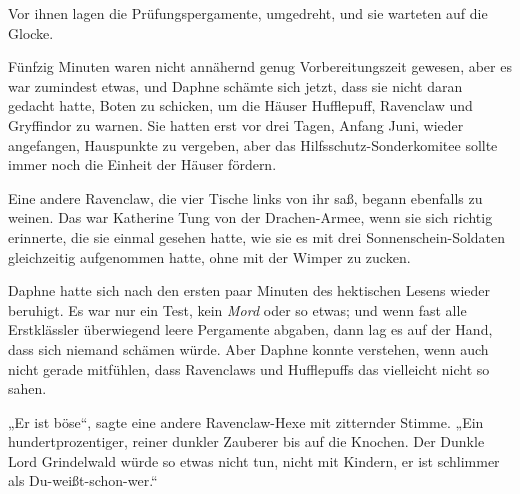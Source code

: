Vor ihnen lagen die Prüfungspergamente, umgedreht, und sie warteten auf die Glocke.

Fünfzig Minuten waren nicht annähernd genug Vorbereitungszeit gewesen, aber es war zumindest etwas, und Daphne schämte sich jetzt, dass sie nicht daran gedacht hatte, Boten zu schicken, um die Häuser Hufflepuff, Ravenclaw und Gryffindor zu warnen. Sie hatten erst vor drei Tagen, Anfang Juni, wieder angefangen, Hauspunkte zu vergeben, aber das Hilfsschutz-Sonderkomitee sollte immer noch die Einheit der Häuser fördern.

Eine andere Ravenclaw, die vier Tische links von ihr saß, begann ebenfalls zu weinen. Das war Katherine Tung von der Drachen-Armee, wenn sie sich richtig erinnerte, die sie einmal gesehen hatte, wie sie es mit drei Sonnenschein-Soldaten gleichzeitig aufgenommen hatte, ohne mit der Wimper zu zucken.

Daphne hatte sich nach den ersten paar Minuten des hektischen Lesens wieder beruhigt. Es war nur ein Test, kein \emph{Mord} oder so etwas; und wenn fast alle Erstklässler überwiegend leere Pergamente abgaben, dann lag es auf der Hand, dass sich niemand schämen würde. Aber Daphne konnte verstehen, wenn auch nicht gerade mitfühlen, dass Ravenclaws und Hufflepuffs das vielleicht nicht so sahen.

„Er ist böse“, sagte eine andere Ravenclaw-Hexe mit zitternder Stimme. „Ein hundertprozentiger, reiner dunkler Zauberer bis auf die Knochen. Der Dunkle Lord Grindelwald würde so etwas nicht tun, nicht mit Kindern, er ist schlimmer als Du-weißt-schon-wer.“


